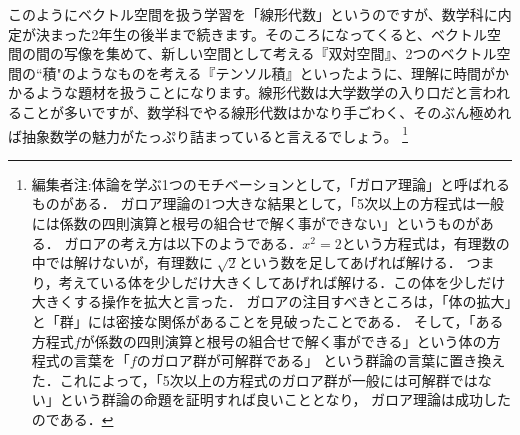このようにベクトル空間を扱う学習を「線形代数」というのですが、数学科に内定が決まった2年生の後半まで続きます。そのころになってくると、ベクトル空間の間の写像を集めて、新しい空間として考える『双対空間』、2つのベクトル空間の``積"のようなものを考える『テンソル積』といったように、理解に時間がかかるような題材を扱うことになります。線形代数は大学数学の入り口だと言われることが多いですが、数学科でやる線形代数はかなり手ごわく、そのぶん極めれば抽象数学の魅力がたっぷり詰まっていると言えるでしょう。
\footnote{編集者注:体論を学ぶ1つのモチベーションとして，「ガロア理論」と呼ばれるものがある．
ガロア理論の1つ大きな結果として，「5次以上の方程式は一般には係数の四則演算と根号の組合せで解く事ができない」というものがある．
ガロアの考え方は以下のようである．$x^2 = 2$という方程式は，有理数の中では解けないが，有理数に$\sqrt[]{2}$という数を足してあげれば解ける．
つまり，考えている体を少しだけ大きくしてあげれば解ける．この体を少しだけ大きくする操作を拡大と言った．
ガロアの注目すべきところは，「体の拡大」と「群」には密接な関係があることを見破ったことである．
そして，「ある方程式$f$が係数の四則演算と根号の組合せで解く事ができる」という体の方程式の言葉を「$f$のガロア群が可解群である」
という群論の言葉に置き換えた．これによって，「5次以上の方程式のガロア群が一般には可解群ではない」という群論の命題を証明すれば良いこととなり，
ガロア理論は成功したのである．}
